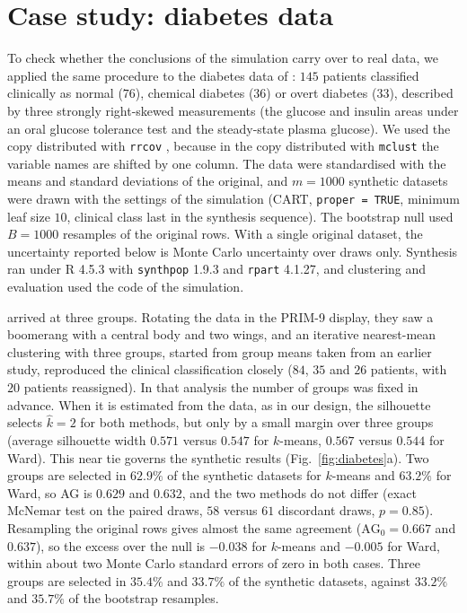 \documentclass[pdflatex,referee]{sn-jnl}
\begin{document}
\section{Case study: diabetes data}\label{sec:case}

To check whether the conclusions of the simulation carry over to real data, we
applied the same procedure to the diabetes data of \citet{reaven1979}: $145$
patients classified clinically as normal ($76$), chemical diabetes ($36$) or
overt diabetes ($33$), described by three strongly right-skewed measurements
(the glucose and insulin areas under an oral glucose tolerance test and the
steady-state plasma glucose). We used the copy distributed with
\texttt{rrcov} \citep{todorov2009}, because in the copy distributed with
\texttt{mclust} \citep{scrucca2016} the variable names are shifted by one
column. The data were standardised with the means and standard deviations of
the original, and $m = 1000$ synthetic datasets were drawn with the settings of
the simulation (CART, \texttt{proper = TRUE}, minimum leaf size $10$, clinical
class last in the synthesis sequence). The bootstrap null used $B = 1000$
resamples of the original rows. With a single original dataset, the
uncertainty reported below is Monte Carlo uncertainty over draws only.
Synthesis ran under \textsf{R} 4.5.3 with \texttt{synthpop} 1.9.3 and
\texttt{rpart} 4.1.27, and clustering and evaluation used the code of the
simulation.

\citet{reaven1979} arrived at three groups. Rotating the data in the PRIM-9
display, they saw a boomerang with a central body and two wings, and an
iterative nearest-mean clustering \citep{friedman1967} with three groups,
started from group means taken from an earlier study, reproduced the clinical
classification closely ($84$, $35$ and $26$ patients, with $20$ patients
reassigned). In that analysis the number of groups was fixed in advance. When
it is estimated from the data, as in our design, the silhouette selects
$\hat k = 2$ for both methods, but only by a small margin over three groups
(average silhouette width $0.571$ versus $0.547$ for $k$-means, $0.567$ versus
$0.544$ for Ward). This near tie governs the synthetic results
(Fig.~\ref{fig:diabetes}a). Two groups are selected in $62.9\%$ of the
synthetic datasets for $k$-means and $63.2\%$ for Ward, so AG is $0.629$ and
$0.632$, and the two methods do not differ (exact McNemar test on the paired
draws, $58$ versus $61$ discordant draws, $p = 0.85$). Resampling the original
rows gives almost the same agreement ($\mathrm{AG}_0 = 0.667$ and $0.637$), so
the excess over the null is $-0.038$ for $k$-means and $-0.005$ for Ward, within
about two Monte Carlo standard errors of zero in both cases. Three groups are
selected in $35.4\%$ and $33.7\%$ of the synthetic datasets, against $33.2\%$
and $35.7\%$ of the bootstrap resamples.
\end{document}
